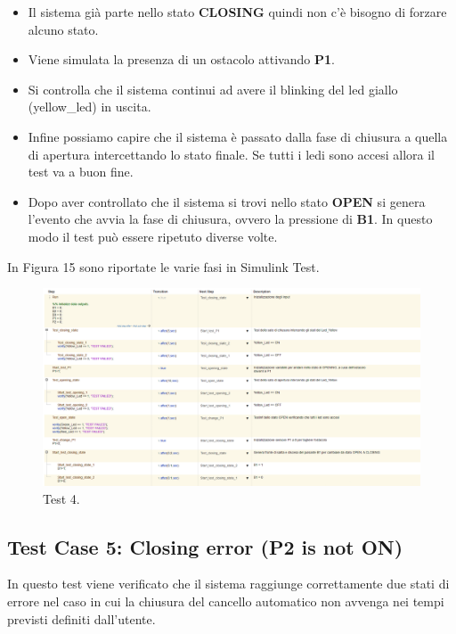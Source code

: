 \documentclass[12pt]{article}
\begin{document}
\begin{itemize}
    \item Il sistema già parte nello stato \textbf{CLOSING} quindi non c'è bisogno di forzare alcuno stato.
    \item Viene simulata la presenza di un ostacolo attivando \textbf{P1}.
    \item Si controlla che il sistema continui ad avere il blinking del led giallo (yellow\_led) in uscita.
    \item Infine possiamo capire che il sistema è passato dalla fase di chiusura a quella di apertura intercettando lo stato finale. Se tutti i ledi sono accesi allora il test va a buon fine. 
    \item Dopo aver controllato che il sistema si trovi nello stato \textbf{OPEN} si genera l'evento che avvia la fase di chiusura, ovvero la pressione di \textbf{B1}. In questo modo il test può essere ripetuto diverse volte.
\end{itemize}

In Figura 15 sono riportate le varie fasi in Simulink Test.
\begin{figure}[H]
    
    \hspace{-2.3cm} %
    \includegraphics[width=1.3\textwidth]{Immagini_Test/Test_4_img.PNG}
    \caption{Test 4.}
    \label{fig:Test_4}
\end{figure}

\subsection{Test Case 5: Closing error (P2 is not ON)}
In questo test viene verificato che il sistema raggiunge correttamente due stati di errore nel caso in cui la chiusura del cancello automatico non avvenga nei tempi previsti definiti dall'utente.
\end{document}
